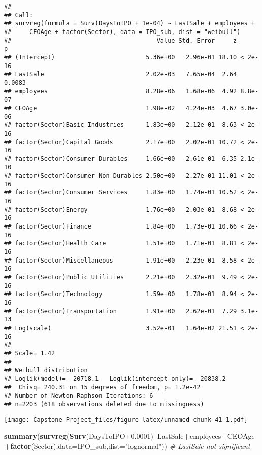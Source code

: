 \documentclass[]{article}
\newenvironment{Shaded}{\begin{snugshade}}{\end{snugshade}}
\newcommand{\CommentTok}[1]{\textcolor[rgb]{0.56,0.35,0.01}{\textit{#1}}}
\newcommand{\DataTypeTok}[1]{\textcolor[rgb]{0.13,0.29,0.53}{#1}}
\newcommand{\FloatTok}[1]{\textcolor[rgb]{0.00,0.00,0.81}{#1}}
\newcommand{\KeywordTok}[1]{\textcolor[rgb]{0.13,0.29,0.53}{\textbf{#1}}}
\newcommand{\NormalTok}[1]{#1}
\newcommand{\OperatorTok}[1]{\textcolor[rgb]{0.81,0.36,0.00}{\textbf{#1}}}
\newcommand{\StringTok}[1]{\textcolor[rgb]{0.31,0.60,0.02}{#1}}
\begin{document}
\begin{verbatim}
## 
## Call:
## survreg(formula = Surv(DaysToIPO + 1e-04) ~ LastSale + employees + 
##     CEOAge + factor(Sector), data = IPO_sub, dist = "weibull")
##                                        Value Std. Error     z       p
## (Intercept)                         5.36e+00   2.96e-01 18.10 < 2e-16
## LastSale                            2.02e-03   7.65e-04  2.64  0.0083
## employees                           8.28e-06   1.68e-06  4.92 8.8e-07
## CEOAge                              1.98e-02   4.24e-03  4.67 3.0e-06
## factor(Sector)Basic Industries      1.83e+00   2.12e-01  8.63 < 2e-16
## factor(Sector)Capital Goods         2.17e+00   2.02e-01 10.72 < 2e-16
## factor(Sector)Consumer Durables     1.66e+00   2.61e-01  6.35 2.1e-10
## factor(Sector)Consumer Non-Durables 2.50e+00   2.27e-01 11.01 < 2e-16
## factor(Sector)Consumer Services     1.83e+00   1.74e-01 10.52 < 2e-16
## factor(Sector)Energy                1.76e+00   2.03e-01  8.68 < 2e-16
## factor(Sector)Finance               1.84e+00   1.73e-01 10.66 < 2e-16
## factor(Sector)Health Care           1.51e+00   1.71e-01  8.81 < 2e-16
## factor(Sector)Miscellaneous         1.91e+00   2.23e-01  8.58 < 2e-16
## factor(Sector)Public Utilities      2.21e+00   2.32e-01  9.49 < 2e-16
## factor(Sector)Technology            1.59e+00   1.78e-01  8.94 < 2e-16
## factor(Sector)Transportation        1.91e+00   2.62e-01  7.29 3.1e-13
## Log(scale)                          3.52e-01   1.64e-02 21.51 < 2e-16
## 
## Scale= 1.42 
## 
## Weibull distribution
## Loglik(model)= -20718.1   Loglik(intercept only)= -20838.2
##  Chisq= 240.31 on 15 degrees of freedom, p= 1.2e-42 
## Number of Newton-Raphson Iterations: 6 
## n=2203 (618 observations deleted due to missingness)
\end{verbatim}

\texttt{[image: Capstone-Project\_files/figure-latex/unnamed-chunk-41-1.pdf]}

\begin{Shaded}
\begin{Highlighting}[]
\KeywordTok{summary}\NormalTok{(}\KeywordTok{survreg}\NormalTok{(}\KeywordTok{Surv}\NormalTok{(DaysToIPO}\FloatTok{+0.0001}\NormalTok{)}\OperatorTok{~}\NormalTok{LastSale}\OperatorTok{+}\NormalTok{employees}\OperatorTok{+}\NormalTok{CEOAge}\OperatorTok{+}\KeywordTok{factor}\NormalTok{(Sector),}\DataTypeTok{data=}\NormalTok{IPO_sub,}\DataTypeTok{dist=}\StringTok{"lognormal"}\NormalTok{)) }\CommentTok{# LastSale not significant}
\end{Highlighting}
\end{Shaded}
\end{document}
